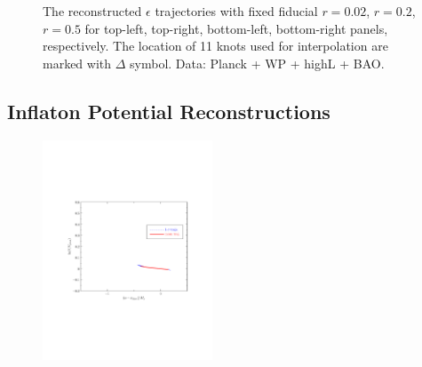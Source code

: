 \documentclass[11pt]{article}
\def \halffigwidth{0.45\textwidth}
\begin{document}
\begin{figure}
  \caption{The reconstructed $\epsilon$ trajectories with fixed fiducial $r = 0.02$, $r=0.2$, $r=0.5$ for top-left, top-right, bottom-left, bottom-right panels, respectively. The location of 11 knots used for interpolation are marked with $\Delta$ symbol. Data: Planck + WP + highL + BAO. \label{fig:traj_eps_fixr}}
\end{figure}


\subsection{Inflaton Potential Reconstructions}

\begin{figure}
  \includegraphics[width=\halffigwidth,  trim = 1in 2.9in 1in 2.9in]{nobicep_spline0_p11_r0d02_potential_traj.pdf}%

\end{figure}
\end{document}
